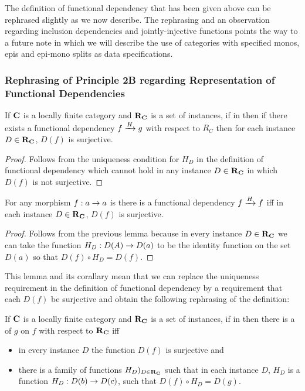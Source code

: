 
The definition of functional dependency  that has been given above 
can be rephrased slightly as we now describe. The rephrasing and an observation regarding
inclusion dependencies and jointly-injective functions points the
way to a future note in which we will describe the use of categories with specified monos, epis and epi-mono splits as data specifications.
\subsubsection{Rephrasing of Principle 2B regarding Representation of Functional Dependencies}
\begin{lemma}
If $\catc$ is a locally finite category and $\reqtc$ is a set of instances, if \fgsourcediag in \catcw
then if there exists a functional dependency $\fundep{H}{f}{g}$  with respect to $R_C$ then
for each instance  $D \in \reqtc$, $D(f)$ is surjective.
\end{lemma}
\begin{proof}
Follows from the uniqueness condition for $H_D$ in the definition of functional dependency which cannot hold in any instance $D \in \reqtc$ in which $D(f)$ is not surjective.
\end{proof}
\begin{corollary}
For any morphism $f:a \morph a$ is \catcw there is a functional dependency $\fundep{H}{f}{f}$ iff
in each instance  $D \in \reqtc$, $D(f)$ is surjective.
\end{corollary}
\begin{proof}
Follows from the previous lemma because in every instance $D \in \reqtc$ 
we can take the function $H_D: D(A) \morph D(a)$ to be the identity function on the set $D(a)$
so that  $D(f) \circ H_D = D(f)$. 
\end{proof}
This lemma and its corallary  mean that we can replace the uniqueness requirement in the 
definition of functional dependency by a requirement that each $D(f)$ be surjective and obtain the following
rephrasing of the definition:
\begin{definition}
If $\catc$ is a locally finite category and $\reqtc$ is a set of instances, if \fgsourcediag in \catcw
then there is a   of $g$ on $f$ with respect to $\reqtc$ iff
\begin{itemize}
\item in every instance $D$ the function $D(f)$ is surjective and
\item
there is a family of functions $H_D)_{D \in \reqtc}$ such that 
in each instance $D$, $H_D$ is a  function $H_D: D(b) \morph D(c)$, 
such that $D(f) \circ H_D = D(g)$. 
\end{itemize}
\end{definition}
